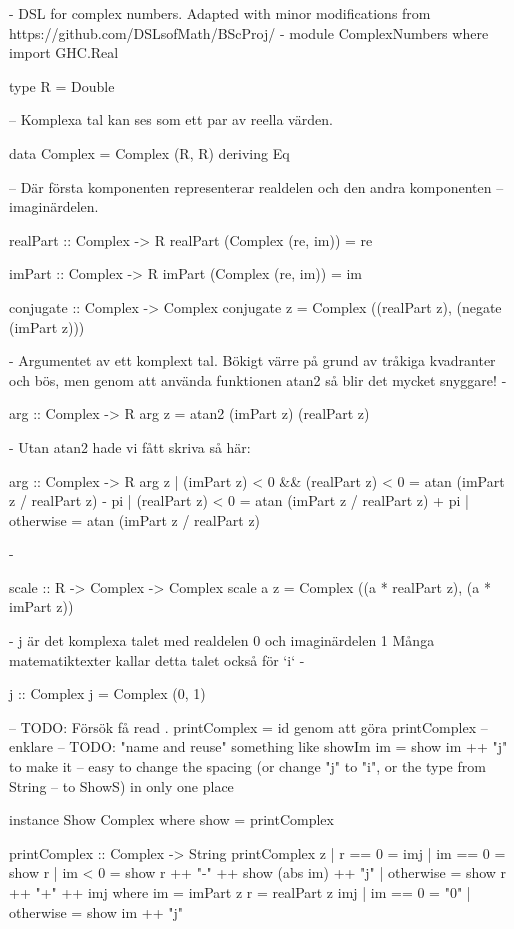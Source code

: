 \begin{codefig}
\label{code:complex}
\begin{code}
{- DSL for complex numbers. Adapted with minor modifications from 
   https://github.com/DSLsofMath/BScProj/ -}
module ComplexNumbers where
import GHC.Real

type R = Double

-- Komplexa tal kan ses som ett par av reella värden.

data Complex = Complex (R, R)
    deriving Eq

-- Där första komponenten representerar realdelen och den andra komponenten
-- imaginärdelen.

realPart :: Complex -> R
realPart (Complex (re, im)) = re

imPart :: Complex -> R
imPart (Complex (re, im)) = im

conjugate :: Complex -> Complex
conjugate z = Complex ((realPart z), (negate (imPart z)))

{-
   Argumentet av ett komplext tal.
   Bökigt värre på grund av tråkiga kvadranter och bös,
   men genom att använda funktionen atan2 så blir det mycket snyggare!
-}

arg :: Complex -> R
arg z = atan2 (imPart z) (realPart z)

{-
   Utan atan2 hade vi fått skriva så här:

   arg :: Complex -> R
   arg z  | (imPart z) < 0  && (realPart z) < 0 = atan (imPart z / realPart z) - pi
          | (realPart z) < 0                    = atan (imPart z / realPart z) + pi
          | otherwise                           = atan (imPart z / realPart z)

-}

scale :: R -> Complex -> Complex
scale a z = Complex ((a * realPart z), (a * imPart z))

{-
   j är det komplexa talet med realdelen 0 och imaginärdelen 1
   Många matematiktexter kallar detta talet också för `i`
-}

j :: Complex
j = Complex (0, 1)

-- TODO: Försök få   read . printComplex = id genom att göra printComplex
-- enklare
-- TODO: "name and reuse" something like showIm im = show im ++ "j" to make it
-- easy to change the spacing (or change "j" to "i", or the type from String
-- to ShowS) in only one place

instance Show Complex where
    show = printComplex

printComplex :: Complex -> String
printComplex z
  | r == 0    = imj
  | im == 0   = show r
  | im < 0    = show r ++ "-" ++ show (abs im) ++ "j"
  | otherwise = show r ++ "+" ++ imj
    where im  = imPart z
          r   = realPart z
          imj
            | im == 0  = "0"
            | otherwise = show im ++ "j"


\end{code}
\end{codefig}
